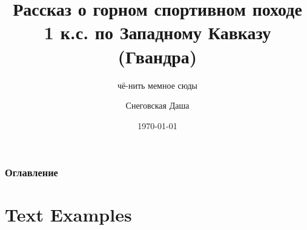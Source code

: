 \documentclass[
11pt, %
]{beamer}
\title[1 к.с. Гвандра 2024]{Рассказ о горном спортивном походе 1 к.с. по Западному Кавказу (Гвандра)} %
\subtitle{чё-нить мемное сюды} %
\author[Снеговская Даша]{Снеговская Даша} %
\institute[ГС МФТИ]{Горная секция МФТИ} %
\date[\today]{\today} %
\begin{document}
	
	
	\begin{frame}
		\titlepage %
	\end{frame}
	
	
	
	\begin{frame}
		\frametitle{Оглавление} %
		
		\tableofcontents %
	\end{frame}
	
	
	\section{Text Examples} %
	
\end{document}
